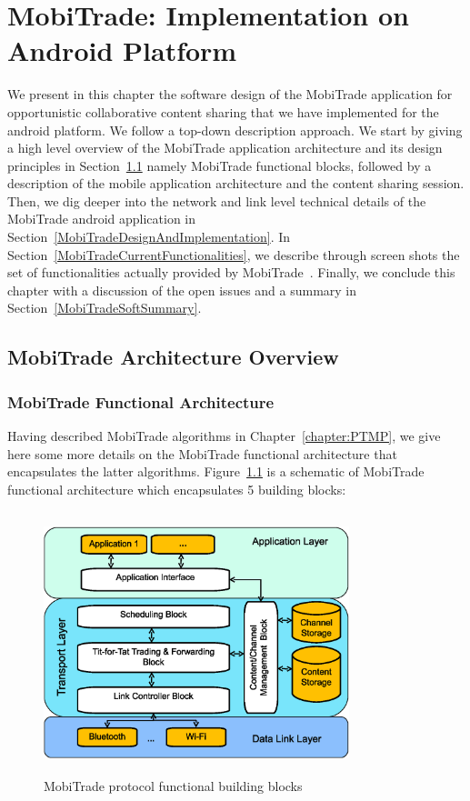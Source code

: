 ﻿\chapter{MobiTrade: Implementation on Android Platform}
\label{chapter:MobiTrade}
\minitoc

We present in this chapter the software design of the MobiTrade application for opportunistic collaborative content sharing that we have implemented for the android platform. We follow a top-down description approach. We start by giving a high level overview of the MobiTrade application architecture and its design principles in Section~\ref{MobiTradeArchitecture} namely MobiTrade functional blocks, followed by a description of the mobile application architecture and the content sharing session. Then, we dig deeper into the network and link level technical details of the MobiTrade android application in Section~\ref{MobiTradeDesignAndImplementation}. In Section~\ref{MobiTradeCurrentFunctionalities}, we describe through screen shots the set of functionalities actually provided by MobiTrade~\cite{MobiTradeAndroid}. Finally, we conclude this chapter with a discussion of the open issues and a summary in Section~\ref{MobiTradeSoftSummary}.

\section{MobiTrade Architecture Overview}
\label{MobiTradeArchitecture}

\subsection{MobiTrade Functional Architecture}
\label{MobiTrade-functional-architecture}

Having described MobiTrade algorithms in Chapter~\ref{chapter:PTMP}, we give here some more details on the MobiTrade functional architecture that encapsulates the latter algorithms. Figure~\ref{MobiTrade-node-architecture} is a schematic of MobiTrade functional architecture which encapsulates 5 building blocks:

\begin{figure}[!h]
\centering
\includegraphics[width=3.5in,height=3in]{Chapitre6/MobiTrade_Node.eps}
\caption{MobiTrade protocol functional building blocks}
\label{MobiTrade-node-architecture}
\end{figure}

